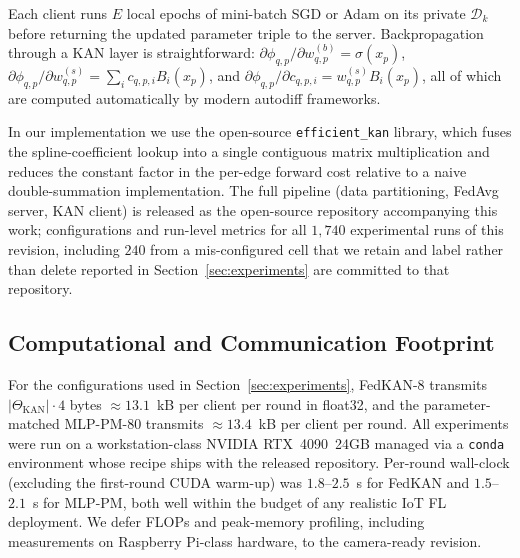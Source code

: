 Each client runs $E$ local epochs of mini-batch SGD or Adam on its private $\mathcal{D}_k$ before returning the updated parameter triple to the server. Backpropagation through a KAN layer is straightforward: $\partial \phi_{q,p}/\partial w^{(b)}_{q,p} = \sigma(x_p)$, $\partial \phi_{q,p}/\partial w^{(s)}_{q,p} = \sum_i c_{q,p,i} B_i(x_p)$, and $\partial \phi_{q,p}/\partial c_{q,p,i} = w^{(s)}_{q,p} B_i(x_p)$, all of which are computed automatically by modern autodiff frameworks.

In our implementation we use the open-source \texttt{efficient\_kan} library, which fuses the spline-coefficient lookup into a single contiguous matrix multiplication and reduces the constant factor in the per-edge forward cost relative to a naive double-summation implementation. The full pipeline (data partitioning, FedAvg server, KAN client) is released as the open-source repository accompanying this work; configurations and run-level metrics for all $1{,}740$ experimental runs of this revision, including $240$ from a mis-configured cell that we retain and label rather than delete reported in Section~\ref{sec:experiments} are committed to that repository.

\subsection{Computational and Communication Footprint}\label{subsec:cost}

For the configurations used in Section~\ref{sec:experiments}, FedKAN-8 transmits $|\Theta_{\text{KAN}}| \cdot 4$ bytes $\approx 13.1$~kB per client per round in float32, and the parameter-matched MLP-PM-80 transmits $\approx 13.4$~kB per client per round. All experiments were run on a workstation-class NVIDIA RTX~4090~24GB managed via a \texttt{conda} environment whose recipe ships with the released repository. Per-round wall-clock (excluding the first-round CUDA warm-up) was $1.8$--$2.5$~s for FedKAN and $1.5$--$2.1$~s for MLP-PM, both well within the budget of any realistic IoT FL deployment. We defer FLOPs and peak-memory profiling, including measurements on Raspberry Pi-class hardware, to the camera-ready revision.
